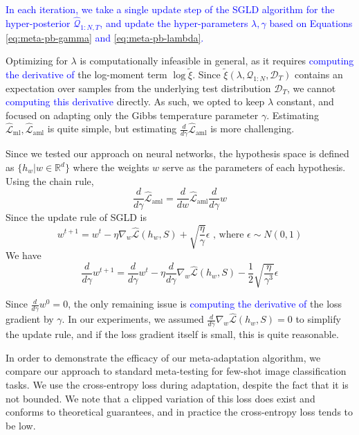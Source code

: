 \documentclass{article}
\theoremstyle{definition}
\newcommand{\LFe}[1]{\textcolor{blue}{#1}}
\begin{document}
\LFe{In each iteration, we take a single update step of the SGLD algorithm for the hyper-posterior $\hat{\mathcal{Q}}_{1:N, T}$, and update the hyper-parameters $\lambda,\gamma$ based on Equations \ref{eq:meta-pb-gamma} and \ref{eq:meta-pb-lambda}.}

Optimizing for $\lambda$ is computationally infeasible in general, as it requires \LFe{computing the derivative of} the log-moment term $\log\tilde{\xi}$. Since $\tilde{\xi}(\lambda, \mathcal{Q}_{1:N},\mathcal{D}_T)$ contains an expectation over samples from the underlying test distribution $\mathcal{D}_T$, we cannot \LFe{computing this derivative } directly. As such, we opted to keep $\lambda$ constant, and focused on adapting only the Gibbs temperature parameter $\gamma$.
Estimating $\hat{\mathcal{L}}_{\mathrm{ml}},\hat{\mathcal{L}}_{\mathrm{aml}}$ is quite simple, but estimating $\frac{d}{d\gamma}\hat{\mathcal{L}}_{\mathrm{aml}}$ is more challenging.

Since we tested our approach on neural networks, the hypothesis space is defined as $\{h_w|w\in \mathbb{R}^d\}$ where the weights $w$ serve as the parameters of each hypothesis.
Using the chain rule, 
$$\frac{d}{d\gamma}\hat{\mathcal{L}}_{\mathrm{aml}}=\frac{d}{dw}\hat{\mathcal{L}}_{\mathrm{aml}}\frac{d}{d\gamma}w$$
Since the update rule of SGLD is 
$$w^{t+1}=w^t-\eta\nabla_w \hat{\mathcal{L}}(h_w,S)+\sqrt{\frac{\eta}{\gamma}}\epsilon \text{ , where } \epsilon\sim N(0,1)$$
We have
\begin{equation}
\frac{d}{d\gamma}w^{t+1}=\frac{d}{d\gamma}w^t-\eta\frac{d}{d\gamma}\nabla_w \hat{\mathcal{L}}(h_w,S)-\frac{1}{2}\sqrt{\frac{\eta}{\gamma^3}}\epsilon
\end{equation}

Since $\frac{d}{d\gamma}w^0=0$, the only remaining issue is \LFe{computing the derivative of} the loss gradient by $\gamma$. In our experiments, we assumed $\frac{d}{d\gamma}\nabla_w \hat{\mathcal{L}}(h_w,S)=0$ to simplify the update rule, and if the loss gradient itself is small, this is quite reasonable.

In order to demonstrate the efficacy of our meta-adaptation algorithm, we compare our approach to standard meta-testing for few-shot image classification tasks. 
We use the cross-entropy loss during adaptation, despite the fact that it is not bounded. We note that a clipped variation of this loss does exist and conforms to theoretical guarantees, and in practice the cross-entropy loss tends to be low.
\end{document}

